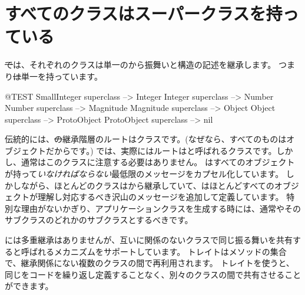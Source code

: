\documentclass[a4paper,10pt,twoside]{book}
\begin{document}
\section{すべてのクラスはスーパークラスを持っている}


\st では、それぞれのクラスは単一のから振舞いと構造の記述を継承します。
つまり\st は単一を持っています。

\begin{code}{@TEST}
SmallInteger superclass --> Integer
Integer superclass          --> Number
Number superclass        --> Magnitude
Magnitude superclass    --> Object
Object superclass           --> ProtoObject
ProtoObject superclass  --> nil
\end{code}

伝統的には、\st の継承階層のルートはクラスです。(なぜなら、すべてのものはオブジェクトだからです。)
\pharo では、実際にはルートはと呼ばれるクラスです。しかし、通常はこのクラスに注意する必要はありません。
はすべてのオブジェクトが持って\emph{いなければならない}最低限のメッセージをカプセル化しています。
しかしながら、ほとんどのクラスはから継承していて、はほとんどすべてのオブジェクトが理解し対応するべき沢山のメッセージを追加して定義しています。
特別な理由がないかぎり、アプリケーションクラスを生成する時には、通常やそのサブクラスのどれかのサブクラスとするべきです。



\pharo には多重継承はありませんが、互いに関係のないクラスで同じ振る舞いを共有すると呼ばれるメカニズムをサポートしています。
トレイトはメソッドの集合で、継承関係にない複数のクラスの間で再利用されます。
トレイトを使うと、同じをコードを繰り返し定義することなく、別々のクラスの間で共有させることができます。

\end{document}
